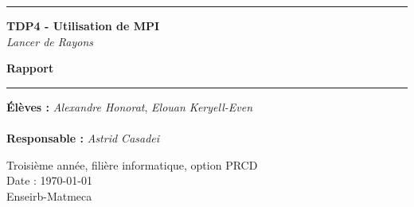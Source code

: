 \thispagestyle{empty}


%
\hrule
\begin{flushleft}
\Huge{\textbf{TDP4 - Utilisation de MPI}}\\
\textit{Lancer de Rayons}
\end{flushleft}
\begin{flushright}
\huge\textbf{Rapport}\\
\end{flushright}
\hrule

\vspace{80pt}
\noindent\textbf{Élèves :}
\emph{Alexandre Honorat}, \emph{Elouan Keryell-Even}\\
\\
\noindent\textbf{Responsable :}
\emph{Astrid Casadei}\\


\vspace{60pt}
\normalsize
\begin{center}
  Troisième année, filière informatique, option PRCD\\
  Date : \today\\
  Enseirb-Matmeca
\end{center}
\vspace{50pt}

